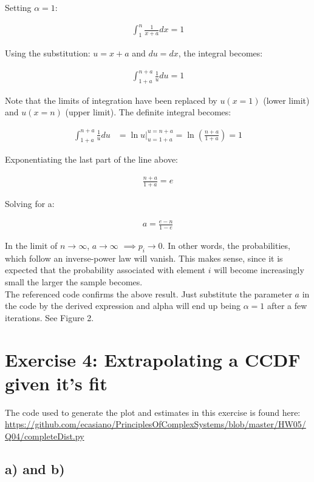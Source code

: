 \documentclass{article}
\begin{document}
Setting $\alpha = 1$:

\begin{align}
\int_{1}^{n} \frac{1}{x+a} dx = 1
\end{align}

Using the substitution: $u = x + a$ and $du = dx$, the integral becomes:

\begin{align}
\int_{1+a}^{n+a} \frac{1}{u} du = 1
\end{align}

Note that the limits of integration have been replaced by $u(x=1)$ (lower limit) and $u(x=n)$ (upper limit). The definite integral becomes:

\begin{align}
\int_{1+a}^{n+a} \frac{1}{u} du &= \ln u |_{u=1+a}^{u=n+a} = \ln(\frac{n+a}{1+a}) = 1
\end{align} 

Exponentiating the last part of the line above:

\begin{align}
\frac{n+a}{1+a} = e
\end{align}

Solving for a:

\begin{align}
a = \frac{e-n}{1-e} 
\end{align}

In the limit of $n\to\infty$, $a\to\infty$ $\implies p_i \to 0$. In other words, the probabilities, which follow an inverse-power law will vanish. This makes sense, since it is expected that the probability associated with element $i$ will become increasingly small the larger the sample becomes. \\

The referenced code confirms the above result. Just substitute the parameter $a$ in the code by the derived expression and alpha will end up being $\alpha=1$ after a few iterations. See Figure 2.

\section{Exercise 4: Extrapolating a CCDF given it's fit}

The code used to generate the plot and estimates in this exercise is found here: \url{https://github.com/ecasiano/PrinciplesOfComplexSystems/blob/master/HW05/Q04/completeDist.py}

\subsection{a) and b)}
\end{document}
